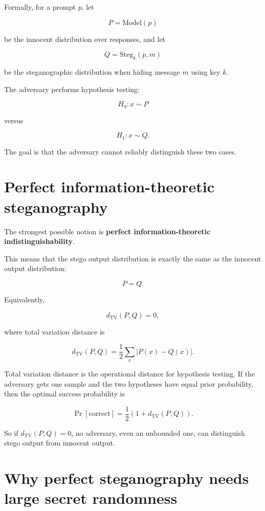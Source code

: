\documentclass[11pt]{article}
\begin{document}
Formally, for a prompt $p$, let

\[
P = \mathrm{Model}(p)
\]

be the innocent distribution over responses, and let

\[
Q = \mathrm{Steg}_k(p,m)
\]

be the steganographic distribution when hiding message $m$ using key $k$.

The adversary performs hypothesis testing:

\[
H_0: x \sim P
\]

versus

\[
H_1: x \sim Q.
\]

The goal is that the adversary cannot reliably distinguish these two cases.

\section{Perfect information-theoretic steganography}

\begin{definition}
\label{def:perfect-indistinguishability}
The strongest possible notion is \textbf{perfect information-theoretic indistinguishability}.

This means that the stego output distribution is exactly the same as the innocent output distribution:

\[
P = Q.
\]

Equivalently,

\[
d_{\mathrm{TV}}(P,Q)=0,
\]

where total variation distance is

\[
d_{\mathrm{TV}}(P,Q)
=
\frac12 \sum_x |P(x)-Q(x)|.
\]
\end{definition}

\begin{fact}
\label{fact:tv-operational}
Total variation distance is the operational distance for hypothesis testing. If the adversary gets one sample and the two hypotheses have equal prior probability, then the optimal success probability is

\[
\Pr[\text{correct}]
=
\frac12\left(1+d_{\mathrm{TV}}(P,Q)\right).
\]
\end{fact}

So if $d_{\mathrm{TV}}(P,Q)=0$, no adversary, even an unbounded one, can distinguish stego output from innocent output.

\section{Why perfect steganography needs large secret randomness}
\end{document}

